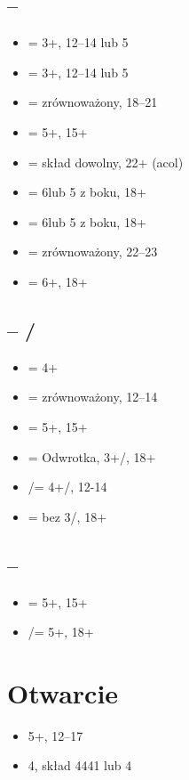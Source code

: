 \documentclass[12pt]{article}
\begin{document}
\subsection{\texorpdfstring{\Cs[1] – \Ds[1]}{1C – 1D}}
\begin{itemize}
    \item \Hs[1] = 3+\Hs, 12–14 lub 5
    \item \Hs[1] = 3+\Ss, 12–14 lub 5
    \item \NT[1] = zrównoważony, 18–21
    \item \Cs[2] = 5+\Cs, 15+
    \item \Ds[2] = skład dowolny, 22+ (acol)
    \item \Hs[2] = 6\Hs lub 5 z boku, 18+
    \item \Ss[2] = 6\Ss lub 5 z boku, 18+
    \item \NT[2] = zrównoważony, 22–23
    \item \Cs[3] = 6+\Cs, 18+
\end{itemize}
\subsection{\texorpdfstring{\Cs[1] – \Hs[1]/\Ss}{1C – 1H/S}}
\begin{itemize}
    \item \Ss[1] = 4+\Ss
    \item \NT[1] = zrównoważony, 12–14
    \item \Cs[2] = 5+\Cs, 15+
    \item \Ds[2] = Odwrotka, 3+\Hs/\Ss, 18+
    \item \Hs[2]/\Ss[] = 4+\Hs/\Ss, 12-14
    \item \NT[2] = bez 3\Hs/\Ss, 18+
\end{itemize}
\subsection{\texorpdfstring{\Cs[1] – \NT[1]}{1C – 1NT}}
\begin{itemize}
    \item \Cs[2] = 5+\Cs, 15+
    \item \Hs[2]/\Ss[] = 5+, 18+
\end{itemize}

\newpage
\section{Otwarcie \texorpdfstring {\Ds[1]}{1D}}
\begin{itemize}
    \item 5+\Ds, 12–17
    \item 4\Ds, skład 4441 lub 4\Cs
\end{itemize}
\end{document}
